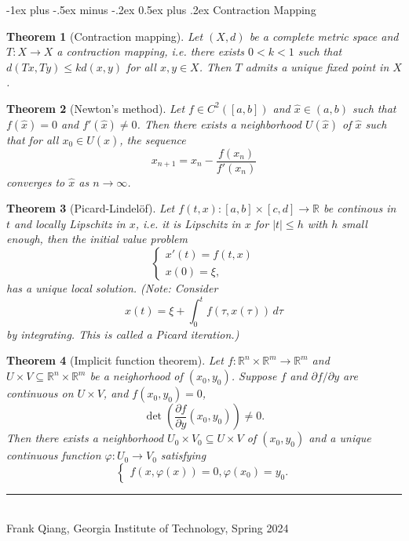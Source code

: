 \documentclass[10pt,landscape]{article}
\makeatletter
\newtheorem{theorem}{Theorem}
\newcommand{\R}{\mathbb{R}}
\renewcommand{\section}{\@startsection{section}{1}{0mm}%
                                {-1ex plus -.5ex minus -.2ex}%
                                {0.5ex plus .2ex}%
                                {\normalfont\large\bfseries}}
\makeatother
\begin{document}
\begin{multicols}{3}
\section{Contraction Mapping}
\begin{theorem}[Contraction mapping]
  Let $(X, d)$ be a complete metric space and
  $T : X \to X$ a contraction mapping, i.e.
  there exists $0 < k < 1$ such that
  $d(Tx, Ty) \le k d(x, y)$ for all $x, y \in X$.
  Then $T$ admits a unique fixed point in $X$.
\end{theorem}

\begin{theorem}[Newton's method]
  Let $f \in C^2([a, b])$ and $\hat{x} \in (a, b)$
  such that $f(\hat{x}) = 0$ and $f'(\hat{x}) \ne 0$.
  Then there exists a neighborhood $U(\hat{x})$ of
  $\hat{x}$ such that for all $x_0 \in U(\hat{x})$,
  the sequence
  \[
    x_{n + 1} = x_n - \frac{f(x_n)}{f'(x_n)}
  \]
  converges to $\hat{x}$ as $n \to \infty$.
\end{theorem}

\begin{theorem}[Picard-Lindel\"of]
  Let $f(t, x) : [a, b] \times [c, d] \to \R$ be continous
  in $t$ and locally Lipschitz in $x$, i.e. it is
  Lipschitz in $x$ for $|t| \le h$ with $h$ small enough,
  then the initial value problem
  \[
    \begin{cases}
      x'(t) = f(t, x) \\
      x(0) = \xi,
    \end{cases}
  \]
  has a unique local solution. (Note: Consider
  \[
    x(t) = \xi + \int_0^t f(\tau, x(\tau))\, d\tau
  \]
  by integrating. This is called a \emph{Picard iteration}.)
\end{theorem}

\begin{theorem}[Implicit function theorem]
  Let $f : \R^n \times \R^m \to \R^m$ and
  $U \times V \subseteq \R^n \times \R^m$ be a neighorhood
  of $(x_0, y_0)$. Suppose $f$ and $\partial f / \partial y$
  are continuous on $U \times V$, and $f(x_0, y_0) = 0$,
  \[
    \det\left(\frac{\partial f}{\partial y}(x_0, y_0)\right)
    \ne 0.
  \]
  Then there exists a neighborhood $U_0 \times V_0 \subseteq U \times V$ of
  $(x_0, y_0)$ and a unique continuous function
  $\varphi : U_0 \to V_0$ satisfying
  \[
  \begin{cases}
    f(x, \varphi(x)) = 0,
    \varphi(x_0) = y_0.
  \end{cases}
  \]
\end{theorem}

\vfill
\hrule
~\\
Frank Qiang, Georgia Institute of Technology, Spring 2024
\end{multicols}
\end{document}
